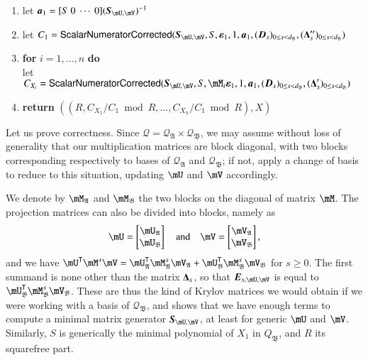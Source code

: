 \documentclass[final,1p,times,authoryear]{elsarticle}
\newcommand{\mat}[1]{\bm{\MakeUppercase{#1}}} %
\newcommand{\row}[1]{\bm{\MakeLowercase{#1}}} %
\newcommand{\col}[1]{\bm{\MakeLowercase{#1}}} %
\newcommand{\lf}{X}
\newcommand{\residueI}{\mathscr{Q}}
\newcommand{\trsp}[1]{#1^{\mathsf{T}}} %
\newcommand{\mUt}{\trsp{\mU}}
\begin{document}
\begin{algorithm}[H]
\begin{enumerate}
    \item\label{residualstep8} { let $\row{a}_1 = [S~0 ~\cdots~ 0] (\mat{S}_{\mU,\mV})^{-1}$}
    \item\label{residualstep9}  let $C_1 = \mathsf{{\sf ScalarNumeratorCorrected}}(\mat{S}_{\mU,\mV}, S, \col{\varepsilon}_1, 1, \row{a}_1,  (\mat{D}_s)_{0 \le s < d_\mathfrak{B}}, (\mat{\Delta}''_s)_{0 \le s < d_\mathfrak{B}})$
    \item\label{residualstep10} \textbf{for} $i=1,\dots,n$ \textbf{do} \\
      \phantom{for}let $C_{X_i} = \mathsf{{\sf ScalarNumeratorCorrected}}(\mat{S}_{\mU,\mV},S, \mM_i\col{\varepsilon}_1, 1, \row{a}_1, (\mat{D}_s)_{0 \le s < d_\mathfrak{B}}, (\mat{\Delta}'_s)_{0 \le s < d_\mathfrak{B}})$
    \item\label{residualstep11}     \textbf{return} $((R, C_{X_1}/ C_1 \bmod R, \dots, C_{X_n}/ C_{1} \bmod R),\lf)$
  \end{enumerate}  \label{algo:block-sparse-fglm-residual}
\end{algorithm}

Let us prove correctness. Since $\residueI=\residueI_\mathfrak{A}
\times \residueI_\mathfrak{B}$, we may assume without loss of
generality that our multiplication matrices are block diagonal, with
two blocks corresponding respectively to bases of $\residueI_\mathfrak{A}$
and $\residueI_\mathfrak{B}$; if not, apply a change of basis to 
reduce to this situation, updating $\mU$ and $\mV$ accordingly. 

We denote by $\mM_\mathfrak{A}$ and $\mM_\mathfrak{B}$ the 
two blocks on the diagonal of matrix $\mM$.
The projection matrices can also be divided into blocks, namely as
$$\mU = \left [\begin{matrix}\mU_\mathfrak{A} \\\mU_\mathfrak{B}
\end{matrix}\right ] \quad\text{and}\quad
\mV = \left [\begin{matrix}\mV_\mathfrak{A} \\\mV_\mathfrak{B}
\end{matrix}\right ],$$
and we have $\mUt \mM^s \mV = \mUt_\mathfrak{A}
\mM_\mathfrak{A}^s \mV_\mathfrak{A} + \mUt_\mathfrak{B}
\mM_\mathfrak{B}^s \mV_\mathfrak{B}$ for $s \ge 0$. The first summand
is none other than the matrix $\mat{\Delta}_s$, so that
$\mat{E}_{s,\mU,\mV}$ is equal to $\mUt_\mathfrak{B}
\mM_\mathfrak{B}^s \mV_\mathfrak{B}$. These are thus the kind of
Krylov matrices we would obtain if we were working with a basis of
$\residueI_\mathfrak{B}$, and shows that we have enough
terms to compute a minimal matrix generator
$\mat{S}_{\mU,\mV}$, at least for generic $\mU$ and $\mV$. 
Similarly, $S$ is generically the minimal polynomial of $X_1$ in
$Q_\mathfrak{B}$, and $R$ its squarefree part.
\end{document}
